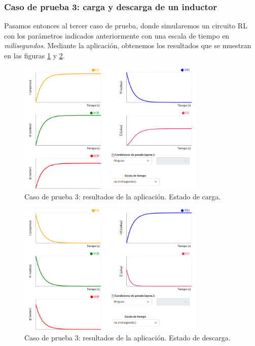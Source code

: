 \documentclass[../main.tex]{subfiles}
\begin{document}
\subsubsection{Caso de prueba 3: carga y descarga de un inductor}
Pasamos entonces al tercer caso de prueba, donde simularemos un circuito RL con los parámetros indicados anteriormente con una escala de tiempo en \textit{milisegundos}. Mediante la aplicación, obtenemos los resultados que se muestran en las figuras \ref{fig::cp3-app} y \ref{fig::cp3.1-app}.

\begin{figure}[!h]
    \centering
    \includegraphics[width=0.8\textwidth]{images/cp3-1.PNG}
    \caption{Caso de prueba 3: resultados de la aplicación. Estado de carga.}
    \label{fig::cp3-app}
\end{figure}

\begin{figure}[!h]
    \centering
    \includegraphics[width=0.8\textwidth]{images/cp3-1.1.PNG}
    \caption{Caso de prueba 3: resultados de la aplicación. Estado de descarga.}
    \label{fig::cp3.1-app}
\end{figure}
\end{document}
